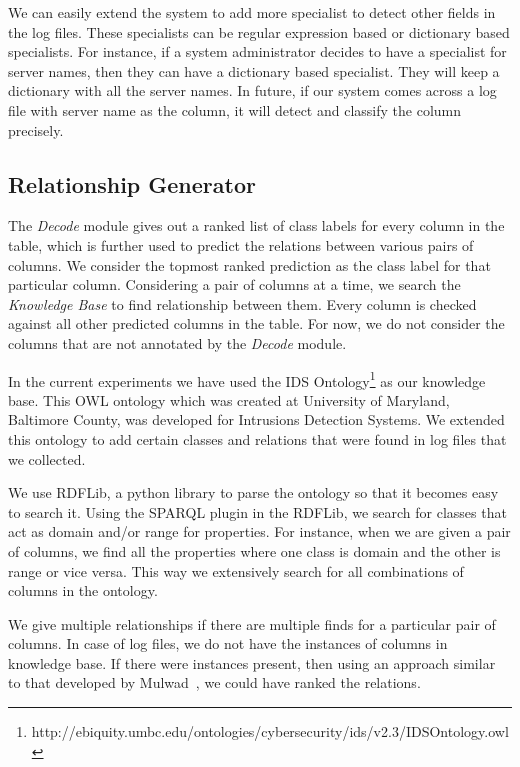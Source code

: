We can easily extend the system to add more specialist to detect other fields in the log files. These specialists can be regular expression based or dictionary based specialists. For instance, if a system administrator decides to have a specialist for server names, then they can have a dictionary based specialist. They will keep a dictionary with all the server names. In future, if  our system comes across a log file with server name as the column, it will detect and classify the column precisely.
 

\subsection{Relationship Generator}
\label{Relationship Generator}

The \textit{Decode} module gives out a ranked list of class labels for every column in the table, which is further used to predict the relations between various pairs of columns. We consider the topmost ranked prediction as the class label for that particular column. Considering a pair of columns at a time, we search the \textit{Knowledge Base} to find relationship between them. Every column is checked against all other predicted columns in the table. For now, we do not consider the columns that are not annotated by the \textit{Decode} module.

In the current experiments we have used the IDS Ontology\footnote{http://ebiquity.umbc.edu/ontologies/cybersecurity/ids/v2.3/IDSOntology.owl} as our knowledge base. This OWL ontology which was created at University of Maryland, Baltimore County, was developed for Intrusions Detection Systems. We extended this ontology to add certain classes and relations that were found in log files that we collected.

We use RDFLib, a python library to parse the ontology so that it becomes easy to search it. Using the SPARQL plugin in the RDFLib, we search for classes that act as domain and/or range for properties. For instance, when we are given a pair of columns, we find all the properties where one class is domain and the other is range or vice versa. This way we extensively search for all combinations of columns in the ontology.

We give multiple relationships if there are multiple finds for a particular pair of columns. In case of log files, we do not have the instances of columns in knowledge base. If there were instances present, then using an approach similar to that developed by Mulwad~\cite{mulwad2015tabel}, we could have ranked the relations.  


